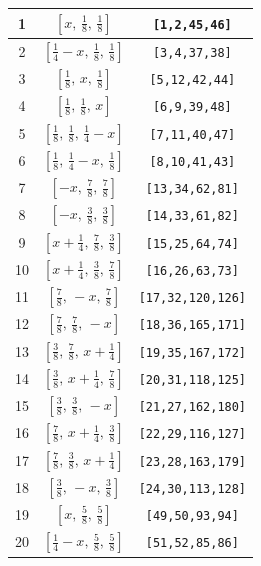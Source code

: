 \documentclass[fleqn,8pt]{jsarticle}
\begin{document}
\begin{longtable}{ccc}
1 & $\left[ x,\, \frac{1}{8},\, \frac{1}{8} \right]$ & {\tt [1,2,45,46]} \\ \hline
2 & $\left[ \frac{1}{4} - x,\, \frac{1}{8},\, \frac{1}{8} \right]$ & {\tt [3,4,37,38]} \\ \hline
3 & $\left[ \frac{1}{8},\, x,\, \frac{1}{8} \right]$ & {\tt [5,12,42,44]} \\ \hline
4 & $\left[ \frac{1}{8},\, \frac{1}{8},\, x \right]$ & {\tt [6,9,39,48]} \\ \hline
5 & $\left[ \frac{1}{8},\, \frac{1}{8},\, \frac{1}{4} - x \right]$ & {\tt [7,11,40,47]} \\ \hline
6 & $\left[ \frac{1}{8},\, \frac{1}{4} - x,\, \frac{1}{8} \right]$ & {\tt [8,10,41,43]} \\ \hline
7 & $\left[ - x,\, \frac{7}{8},\, \frac{7}{8} \right]$ & {\tt [13,34,62,81]} \\ \hline
8 & $\left[ - x,\, \frac{3}{8},\, \frac{3}{8} \right]$ & {\tt [14,33,61,82]} \\ \hline
9 & $\left[ x + \frac{1}{4},\, \frac{7}{8},\, \frac{3}{8} \right]$ & {\tt [15,25,64,74]} \\ \hline
10 & $\left[ x + \frac{1}{4},\, \frac{3}{8},\, \frac{7}{8} \right]$ & {\tt [16,26,63,73]} \\ \hline
11 & $\left[ \frac{7}{8},\, - x,\, \frac{7}{8} \right]$ & {\tt [17,32,120,126]} \\ \hline
12 & $\left[ \frac{7}{8},\, \frac{7}{8},\, - x \right]$ & {\tt [18,36,165,171]} \\ \hline
13 & $\left[ \frac{3}{8},\, \frac{7}{8},\, x + \frac{1}{4} \right]$ & {\tt [19,35,167,172]} \\ \hline
14 & $\left[ \frac{3}{8},\, x + \frac{1}{4},\, \frac{7}{8} \right]$ & {\tt [20,31,118,125]} \\ \hline
15 & $\left[ \frac{3}{8},\, \frac{3}{8},\, - x \right]$ & {\tt [21,27,162,180]} \\ \hline
16 & $\left[ \frac{7}{8},\, x + \frac{1}{4},\, \frac{3}{8} \right]$ & {\tt [22,29,116,127]} \\ \hline
17 & $\left[ \frac{7}{8},\, \frac{3}{8},\, x + \frac{1}{4} \right]$ & {\tt [23,28,163,179]} \\ \hline
18 & $\left[ \frac{3}{8},\, - x,\, \frac{3}{8} \right]$ & {\tt [24,30,113,128]} \\ \hline
19 & $\left[ x,\, \frac{5}{8},\, \frac{5}{8} \right]$ & {\tt [49,50,93,94]} \\ \hline
20 & $\left[ \frac{1}{4} - x,\, \frac{5}{8},\, \frac{5}{8} \right]$ & {\tt [51,52,85,86]} \\ \hline

\end{longtable}
\end{document}
